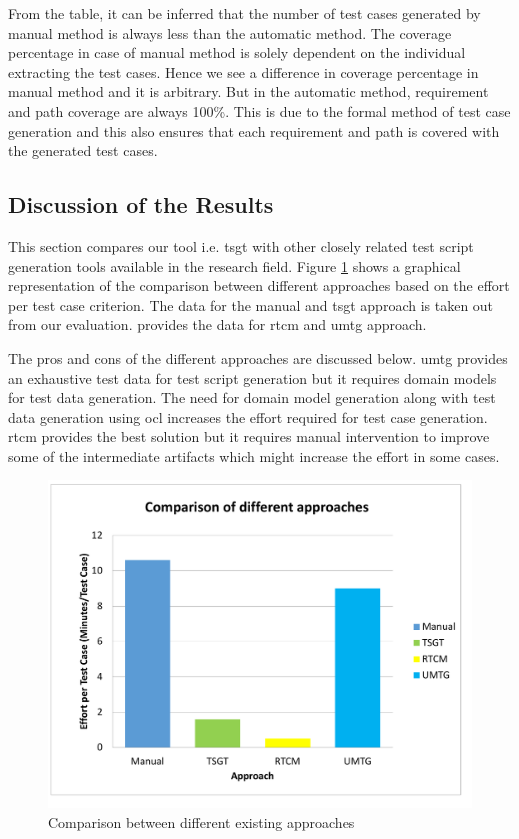 From the table, it can be inferred that the number of test cases generated by manual method is always less than the automatic method. The coverage percentage in case of manual method is solely dependent on the individual extracting the test cases. Hence we see a difference in coverage percentage in manual method and it is arbitrary. But in the automatic method, requirement and path coverage are always 100\%. This is due to the formal method of test case generation and this also ensures that each requirement and path is covered with the generated test cases. 

\subsection{Discussion of the Results}
This section compares our tool i.e. \gls{tsgt} with other closely related test script generation tools available in the research field. Figure \ref{fig:chap6fig3} shows a graphical representation of the comparison between different approaches based on the effort per test case criterion. The data for the manual and \gls{tsgt} approach is taken out from our evaluation. \cite{yue2015rtcm}provides the data for \gls{rtcm} and \gls{umtg} approach.

The pros and cons of the different approaches are discussed below. \gls{umtg} provides an exhaustive test data for test script generation but it requires domain models for test data generation. The need for domain model generation along with test data generation using \gls{ocl} increases the effort required for test case generation. \gls{rtcm} provides the best solution but it requires manual intervention to improve some of the intermediate artifacts which might increase the effort in some cases. 

\begin{figure}[htb!]
\centering
\includegraphics[scale=0.45]{content/images/Chapter6/figure3.pdf}
\caption{Comparison between different existing approaches}
\label{fig:chap6fig3}
\end{figure}


